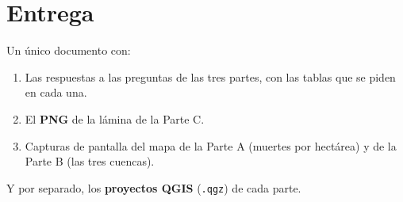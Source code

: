 \documentclass{article}
\begin{document}
\section{Entrega}

Un único documento con:

\begin{enumerate}
    \item Las respuestas a las preguntas de las tres partes, con las tablas que se piden en cada una.
    \item El \textbf{PNG} de la lámina de la Parte C.
    \item Capturas de pantalla del mapa de la Parte A (muertes por hectárea) y de la Parte B (las tres cuencas).
\end{enumerate}

Y por separado, los \textbf{proyectos QGIS} (\texttt{.qgz}) de cada parte.
\end{document}
